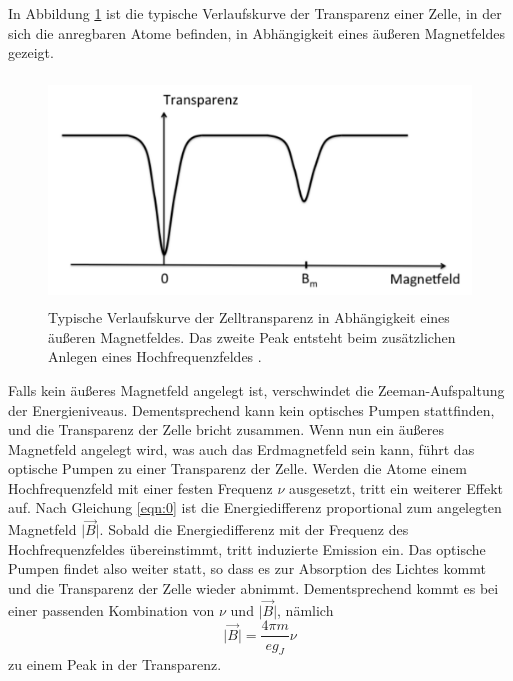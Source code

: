 In Abbildung \ref{fig:theorie4} ist die typische Verlaufskurve der Transparenz einer Zelle, in der sich die anregbaren Atome befinden, in Abhängigkeit eines äußeren Magnetfeldes gezeigt.

\begin{figure}
  \centering
  \includegraphics[height=6cm]{ressources/theorie4.png}
  \caption{Typische Verlaufskurve der Zelltransparenz in Abhängigkeit eines äußeren Magnetfeldes. Das zweite Peak entsteht beim zusätzlichen Anlegen eines Hochfrequenzfeldes \cite{skript}.}
  \label{fig:theorie4}
\end{figure}

Falls kein äußeres Magnetfeld angelegt ist, verschwindet die Zeeman-Aufspaltung der Energieniveaus.
Dementsprechend kann kein optisches Pumpen stattfinden, und die Transparenz der Zelle bricht zusammen.
Wenn nun ein äußeres Magnetfeld angelegt wird, was auch das Erdmagnetfeld sein kann, führt das optische Pumpen zu einer Transparenz der Zelle.
Werden die Atome einem Hochfrequenzfeld mit einer festen Frequenz $\nu$ ausgesetzt, tritt ein weiterer Effekt auf.
Nach Gleichung \eqref{eqn:0} ist die Energiedifferenz proportional zum angelegten Magnetfeld $\lvert \vec{B} \rvert$.
Sobald die Energiedifferenz mit der Frequenz des Hochfrequenzfeldes übereinstimmt, tritt induzierte Emission ein.
Das optische Pumpen findet also weiter statt, so dass es zur Absorption des Lichtes kommt und die Transparenz der Zelle wieder abnimmt.
Dementsprechend kommt es bei einer passenden Kombination von $\nu$ und $\lvert \vec{B} \rvert$, nämlich
\begin{equation}
  \lvert \vec{B} \rvert = \frac{4 \pi m}{e g_J} \nu
\end{equation}
zu einem Peak in der Transparenz.

